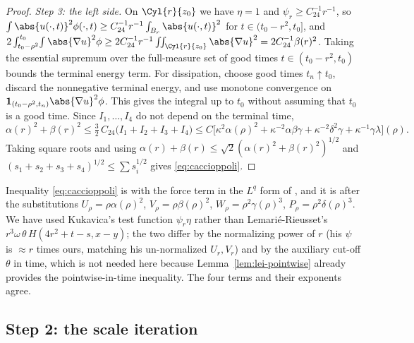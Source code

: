 \documentclass[11pt,reqno]{amsart}
\begin{document}
\begin{proof}
\emph{Step 3: the left side.} On $\Cyl{r}{z_{0}}$ we have $\eta=1$ and
$\psi_{r}\ge C_{24}^{-1}r^{-1}$, so
$\int\abs{u(\cdot,t)}^{2}\phi(\cdot,t)\ge C_{24}^{-1}r^{-1}\int_{B_{r}}\abs{u(\cdot,t)}^{2}$
for $t\in(t_{0}-r^{2},t_{0}]$, and
$2\int_{t_{0}-\rho^{2}}^{t_{0}}\!\int\abs{\nabla u}^{2}\phi
 \ge2C_{24}^{-1}r^{-1}\iint_{\Cyl{r}{z_{0}}}\abs{\nabla u}^{2}
 =2C_{24}^{-1}\beta(r)^{2}$. Taking the essential supremum over the full-measure set of good times
$t\in(t_{0}-r^{2},t_{0})$ bounds the terminal energy term. For dissipation,
choose good times $t_n\uparrow t_0$, discard the nonnegative terminal
energy, and use monotone convergence on
$\mathbf1_{(t_0-\rho^2,t_n)}\abs{\nabla u}^2\phi$.
This gives the integral up to $t_0$ without assuming that $t_0$ is a good
time. Since $I_1,\ldots,I_4$ do not depend on the terminal time,
\[
  \alpha(r)^{2}+\beta(r)^{2}
  \le \tfrac32\,C_{24}\bigl(I_{1}+I_{2}+I_{3}+I_{4}\bigr)
  \le C\bigl[\kappa^{2}\alpha(\rho)^{2}+\kappa^{-2}\alpha\beta\gamma
    +\kappa^{-2}\delta^{2}\gamma+\kappa^{-1}\gamma\lambda\bigr](\rho).
\]
Taking square roots and using
$\alpha(r)+\beta(r)\le\sqrt2(\alpha(r)^{2}+\beta(r)^{2})^{1/2}$ and
$(s_{1}+s_{2}+s_{3}+s_{4})^{1/2}\le\sum s_{i}^{1/2}$ gives
\eqref{eq:caccioppoli}.
\end{proof}

\begin{remark}\label{rem:caccioppoli-sources}
Inequality \eqref{eq:caccioppoli} is \cite[(2.18)]{Kukavica2008} with the force
term in the $L^{q}$ form of \cite[Theorem 2]{Kukavica2008}, and it is
\cite[(13.30)]{LemarieRieusset2016} after the substitutions
$U_{\rho}=\rho\alpha(\rho)^{2}$, $V_{\rho}=\rho\beta(\rho)^{2}$,
$W_{\rho}=\rho^{2}\gamma(\rho)^{3}$, $P_{\rho}=\rho^{2}\delta(\rho)^{3}$. We
have used Kukavica's test function $\psi_{r}\eta$ rather than Lemarié-Rieusset's
$r^{3}\omega\,\theta\,H(4r^{2}+t-s,x-y)$; the two differ by the normalizing
power of $r$ (his $\psi$ is $\approx r$ times ours, matching his un-normalized
$U_{r},V_{r}$) and by the auxiliary cut-off $\theta$ in time, which is not
needed here because Lemma~\ref{lem:lei-pointwise} already provides the
pointwise-in-time inequality. The four terms and their exponents agree.
\end{remark}

\subsection{Step 2: the scale iteration}\label{ss:step2}
\end{document}
